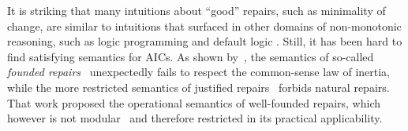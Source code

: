 
It is striking that many intuitions about ``good'' repairs, such as minimality of change, are similar to intuitions that surfaced in other domains of non-monotonic reasoning, such as logic programming  and default logic . 
Still, it has been hard to find satisfying semantics for AICs.
As shown by~\citet{tase/Cruz-FilipeEGN13}, the semantics of so-called \emph{founded repairs}~\cite{iclp/CaropreseGSZ06} unexpectedly fails to respect the common-sense law of inertia, while the more restricted semantics of justified repairs~\cite{tplp/CaropreseT11} forbids natural repairs.
That work proposed the operational semantics of well-founded repairs, which however is not modular~\cite{foiks/Cruz-Filipe14} and therefore restricted in its practical applicability.



